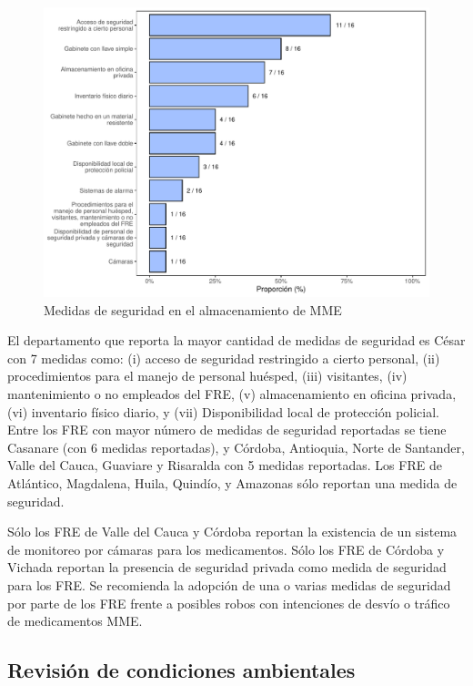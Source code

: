 \documentclass[
]{book}
\begin{document}
\begin{figure}
\includegraphics[width=0.9\linewidth]{InformeFinal_files/figure-latex/MedidasSeguridadAlmacenamientoMME-1} \caption{Medidas de seguridad en el almacenamiento de MME}\label{fig:MedidasSeguridadAlmacenamientoMME}
\end{figure}

El departamento que reporta la mayor cantidad de medidas de seguridad es César con 7 medidas como: (i) acceso de seguridad restringido a cierto personal, (ii) procedimientos para el manejo de personal huésped, (iii) visitantes, (iv) mantenimiento o no empleados del FRE, (v) almacenamiento en oficina privada, (vi) inventario físico diario, y (vii) Disponibilidad local de protección policial. Entre los FRE con mayor número de medidas de seguridad reportadas se tiene Casanare (con 6 medidas reportadas), y Córdoba, Antioquia, Norte de Santander, Valle del Cauca, Guaviare y Risaralda con 5 medidas reportadas. Los FRE de Atlántico, Magdalena, Huila, Quindío, y Amazonas sólo reportan una medida de seguridad.

Sólo los FRE de Valle del Cauca y Córdoba reportan la existencia de un sistema de monitoreo por cámaras para los medicamentos. Sólo los FRE de Córdoba y Vichada reportan la presencia de seguridad privada como medida de seguridad para los FRE. Se recomienda la adopción de una o varias medidas de seguridad por parte de los FRE frente a posibles robos con intenciones de desvío o tráfico de medicamentos MME.

\hypertarget{revisiuxf3n-de-condiciones-ambientales}{%
\subsection{Revisión de condiciones ambientales}\label{revisiuxf3n-de-condiciones-ambientales}}
\end{document}

